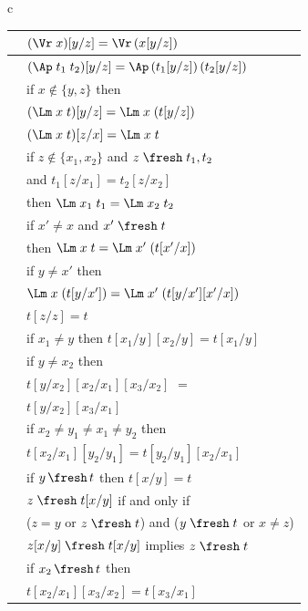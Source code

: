 \begin{figure}
{\begin{tabular}{c}
\begin{tabular}{|c|l|}
	\hline
	\textrm{\RnVr}
	& 
	$(\Vr\;x)[y / z] = \Vr\,(x[y/z])$
	\\\hline 
	\textrm{\RnAp}  & 
	$(\Ap\;t_1\;t_2)[y / z] =  \Ap\,(t_1[y / z])\,(t_2[y / z])$
	\\\hline 
	\textrm{\RnLmO}  & if $x \not\in \{y,z\}$ then  
	\\&
	$(\Lm\;x\;t)[y / z] = \Lm\;x\;(t[y / z])$
	\\\hline 
	\textrm{\RnLmT}  & $(\Lm\;x\;t)[z / x] = \Lm\;x\;t$
		\\\hline 
	\textrm{\RnCg}  &
	if $z \not\in \{x_1,x_2\}$ and 
	$z\;\fresh\;t_1,t_2$ 
	\\&and 
	$t_1[z / x_1] = t_2[z / x_2]$ 
	\\&then 
	$\Lm\;x_1\;t_1 = \Lm\;x_2\;t_2$
	\\\hline 
	\textrm{\RnBvr}  &	
	if $x' \not= x$ and 
	$x'\;\fresh\;t$ 
	\\& then 
	$\Lm\;x\;t = \Lm\;x'\;(t[x' / x])$
	\\\hline 
	\textrm{\RnBvrT}  &	
	if $y \not= x'$ then 
	\\&  
	$\Lm\;x\;(t[y/x']) = \Lm\;x'\;(t[y/x'][x' / x])$
	\\\hline 
	\textrm{\RnId}
	&
	$t[z / z] = t$
	\\\hline
	\textrm{\RnIm} 
	& if $x_1\not=y$ then 
	$t[x_1/y][x_2/y]= t[x_1/y]$
	\\\hline 
	\textrm{\RnCh}  & if $y\not=x_2$ then 
	\\&$t[y/x_2][x_2/x_1][x_3/x_2]$ $=$ 
	\\& $t[y/x_2] [x_3/x_1]$
	\\\hline 
	\textrm{\RnCm}  & if $x_2 \not= y_1 \not= x_1 \not= y_2$ then 
	\\&$t[x_2/x_1] [y_2/y_1]= t[y_2/y_1][x_2/x_1]$
\\\hline 
\textrm{\RnFr} 
& if $y \,\fresh\, t$ then  $t[x/y]= t$
\\\hline 
\textrm{\FrRn} 
&
$z \;\fresh\;t [x / y]$ if and only if    
	\\&($z = y$ or $z \;\fresh\;t$) and ($y \;\fresh\;t$ or $x \not= z$) 
\\\hline 
\textrm{\FrRnT} 
&
$z[x/y] \;\fresh\;t[x/y]$ implies $z \;\fresh\;t$  
\\\hline 
\textrm{\RnChFr}  & if $x_2 \,\fresh\, t$ then 
\\&$t[x_2/x_1][x_3/x_2] = t[x_3/x_1]$
\\\hline 
\end{tabular} 
\\ \\ \vspace*{-1.3ex}

\end{tabular}}
\end{figure}
